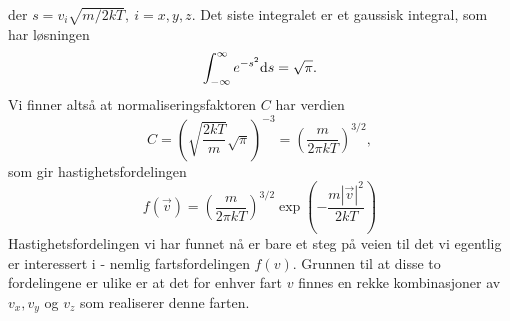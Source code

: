der $s = v_i\sqrt{m/2kT},~i = {x,y,z}$. Det siste integralet er et gaussisk integral, som har løsningen
\begin{displaymath}
	\int_{-\infty}^\infty e^{-s^2} \text{d} s  = \sqrt{\pi}.
\end{displaymath}
Vi finner altså at normaliseringsfaktoren $C$ har verdien
\begin{displaymath}
	C =  \left(\sqrt{\frac{2kT}{m}}\sqrt{\pi}\right)^{-3} = \left(\frac{m}{2\pi kT}\right)^{3/2},
\end{displaymath}
som gir hastighetsfordelingen
\begin{displaymath}
	f(\vec{v}) = \left(\frac{m}{2\pi kT}\right)^{3/2}\exp\left(-\frac{m|\vec{v}|^2}{2kT}\right) 
\end{displaymath}
Hastighetsfordelingen vi har funnet nå er bare et steg på veien til det vi egentlig er interessert i - nemlig fartsfordelingen $f(v)$. Grunnen til at disse to fordelingene er ulike er at det for enhver fart $v$ finnes en rekke kombinasjoner av $v_x, v_y$ og $v_z$ som realiserer denne farten. 